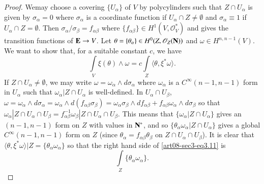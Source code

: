 \begin{proof}
We\pageoriginale may choose a covering $\{U_{\alpha}\}$ of $V$ by polycylinders such that $Z\cap U_{\alpha}$ is given by $\sigma_{\alpha}=0$ where $\sigma_{\alpha}$ is a coordinate function if $U_{\alpha}\cap Z\neq \emptyset$ and $\sigma_{\alpha}\equiv 1$ if $U_{\alpha}\cap Z=\emptyset$. Then $\sigma_{\alpha}/\sigma_{\beta}=f_{\alpha\beta}$ where $\{f_{\alpha\beta}\}\in H^{1}(V,\mathscr{O}^{*}_{V})$ and gives the transition functions of $\mathbf{E}\to V$. Let $\theta=\{\theta_{\alpha}\}\in H^{0}(Z,\mathscr{O}_{Z}(\mathbf{N}))$ and $\omega\in H^{n,n-1}(V)$. We want to show that, for a suitable constant $c$, we have
\begin{equation*}
\int\limits_{V}\xi(\theta)\wedge \omega=c\int\limits_{Z}\langle \theta,\xi^{*}\omega\rangle.\tag{3.11}\label{art08-sec3-eq3.11}
\end{equation*}
If $Z\cap U_{\alpha}\neq \emptyset$, we may write $\omega=\omega_{\alpha}\wedge d\sigma_{\alpha}$ where $\omega_{\alpha}$ is a $C^{\infty}(n-1,n-1)$ form in $U_{\alpha}$ such that $\omega_{\alpha}|Z\cap U_{\alpha}$ is well-defined. In $U_{\alpha}\cap U_{\beta}$, $\omega=\omega_{\alpha}\wedge d\sigma_{\alpha}=\omega_{\alpha}\wedge d(f_{\alpha\beta}\sigma_{\beta})=\omega_{\alpha}\sigma_{\beta}\wedge df_{\alpha\beta}+f_{\alpha\beta}\omega_{\alpha}\wedge d\sigma_{\beta}$ so that $\omega_{\alpha}|Z\cap U_{\alpha}\cap U_{\beta}=f^{-1}_{\alpha\beta}\omega_{\beta}|Z\cap U_{\alpha}\cap U_{\beta}$. This means that $\{\omega_{\alpha}|Z\cap U_{\alpha}\}$ gives an $(n-1,n-1)$ form on $Z$ with values in $\mathbf{N}^{*}$, and so $\{\theta_{\alpha}\omega_{\alpha}|Z\cap U_{\alpha}\}$ gives a global $C^{\infty}(n-1,n-1)$ form on $Z$ (since $\theta_{\alpha}=f_{\alpha\beta}\theta_{\beta}$ on $Z\cap U_{\alpha}\cap U_{\beta}$). It is clear that $\langle \theta,\xi^{*}\omega\rangle |Z=\{\theta_{\alpha}\omega_{\alpha}\}$ so that the right hand side of \eqref{art08-sec3-eq3.11} is
\begin{equation*}
\int\limits_{Z}\{\theta_{\alpha}\omega_{\alpha}\}.\tag{3.12}\label{art08-sec3-eq3.12}
\end{equation*}


\end{proof}
